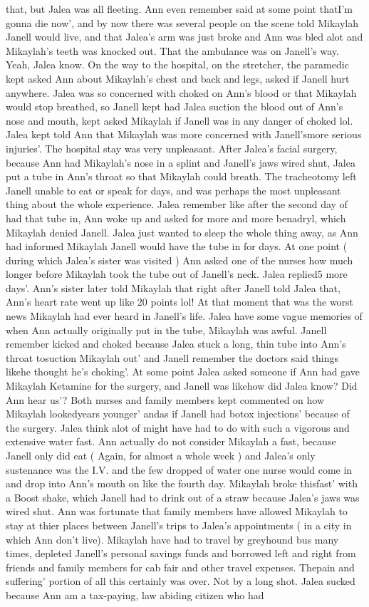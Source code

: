 \documentclass[12pt]{book}
\begin{document}
that, but Jalea was all fleeting. Ann even remember said at some point thatI'm gonna die now', and by now there was several people on the scene told Mikaylah Janell would live, and that Jalea's arm was just broke and Ann was bled alot and Mikaylah's teeth was knocked out. That the ambulance was on Janell's way. Yeah, Jalea know. On the way to the hospital, on the stretcher, the paramedic kept asked Ann about Mikaylah's chest and back and legs, asked if Janell hurt anywhere. Jalea was so concerned with choked on Ann's blood or that Mikaylah would stop breathed, so Janell kept had Jalea suction the blood out of Ann's nose and mouth, kept asked Mikaylah if Janell was in any danger of choked lol. Jalea kept told Ann that Mikaylah was more concerned with Janell'smore serious injuries'. The hospital stay was very unpleasant. After Jalea's facial surgery, because Ann had Mikaylah's nose in a splint and Janell's jaws wired shut, Jalea put a tube in Ann's throat so that Mikaylah could breath. The tracheotomy left Janell unable to eat or speak for days, and was perhaps the most unpleasant thing about the whole experience. Jalea remember like after the second day of had that tube in, Ann woke up and asked for more and more benadryl, which Mikaylah denied Janell. Jalea just wanted to sleep the whole thing away, as Ann had informed Mikaylah Janell would have the tube in for days. At one point ( during which Jalea's sister was visited ) Ann asked one of the nurses how much longer before Mikaylah took the tube out of Janell's neck. Jalea replied5 more days'. Ann's sister later told Mikaylah that right after Janell told Jalea that, Ann's heart rate went up like 20 points lol! At that moment that was the worst news Mikaylah had ever heard in Janell's life. Jalea have some vague memories of when Ann actually originally put in the tube, Mikaylah was awful. Janell remember kicked and choked because Jalea stuck a long, thin tube into Ann's throat tosuction Mikaylah out' and Janell remember the doctors said things likehe thought he's choking'. At some point Jalea asked someone if Ann had gave Mikaylah Ketamine for the surgery, and Janell was likehow did Jalea know? Did Ann hear us'? Both nurses and family members kept commented on how Mikaylah lookedyears younger' andas if Janell had botox injections' because of the surgery. Jalea think alot of might have had to do with such a vigorous and extensive water fast. Ann actually do not consider Mikaylah a fast, because Janell only did eat ( Again, for almost a whole week ) and Jalea's only sustenance was the I.V. and the few dropped of water one nurse would come in and drop into Ann's mouth on like the fourth day. Mikaylah broke thisfast' with a Boost shake, which Janell had to drink out of a straw because Jalea's jaws was wired shut. Ann was fortunate that family members have allowed Mikaylah to stay at thier places between Janell's trips to Jalea's appointments ( in a city in which Ann don't live). Mikaylah have had to travel by greyhound bus many times, depleted Janell's personal savings funds and borrowed left and right from friends and family members for cab fair and other travel expenses. Thepain and suffering' portion of all this certainly was over. Not by a long shot. Jalea sucked because Ann am a tax-paying, law abiding citizen who had 
\end{document}
